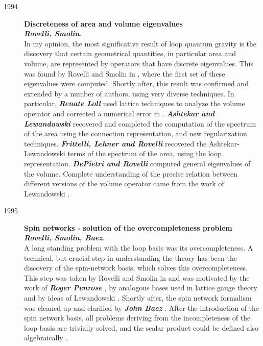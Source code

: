 \begin{description}
	\item[1994] {\bf Discreteness of area and volume eigenvalues\\
	{\em Rovelli, Smolin}}.\\
	In my opinion, the most significative result of loop quantum 
	gravity is the discovery that certain geometrical quantities, 
	in particular area and volume, are represented by operators 
	that have discrete eigenvalues.  This was found by Rovelli 
	and Smolin in \cite{RovelliSmolin95}, where the first set of 
	these eigenvalues were computed.   Shortly after, this result 
	was confirmed and extended by a number of authors, using very 
	diverse techniques.  In particular, \textbf{\em Renate Loll} 
	\cite{Loll95b,Loll95bb} used lattice techniques to analyze 
	the volume operator and corrected a numerical error in 
	\cite{RovelliSmolin95}.  \textbf{\em Ashtekar and 
	Lewandowski} \cite{LewandowskiArea,AshtekarLewandowskiArea2} 
	recovered and completed the computation of the spectrum of 
	the area using the connection representation, and new 
	regularization techniques.  \textbf{\em 
	Frittelli, Lehner and Rovelli} \cite{FrittelliEtAl} recovered 
	the Ashtekar-Lewandowski terms of the spectrum of the area, 
	using the loop representation.  \textbf{\em DePietri and 
	Rovelli\/} \cite{DePietriRovelli} computed general 
	eigenvalues of the volume.  Complete understanding of the 
	precise relation between different versions of the volume 
	operator came from the work of Lewandowski 
	\cite{Lewandowski97}.

	\item[1995] {\bf  Spin networks - solution of the overcompleteness 
	problem\\
	{\em Rovelli, Smolin, Baez}}.\\
	A long standing problem with the loop basis was its 
	overcompleteness.  A technical, but crucial step in understanding 
	the theory has been the discovery of the spin-network basis, which 
	solves this overcompleteness.  This step was taken by Rovelli and 
	Smolin in \cite{RovelliSmolin95b} and was motivated by the work of 
	\textbf{\em Roger Penrose} \cite{Penrose,Penrose2}, by analogous 
	bases used in lattice gauge theory and by ideas of Lewandowski 
	\cite{JerzyGraph}.  Shortly after, the spin network formalism was 
	cleaned up and clarified by \textbf{\em John Baez} 
	\cite{Baez95a,Baez95aa}.  After the introduction of the spin 
	network basis, all problems deriving from the incompleteness of 
	the loop basis are trivially solved, and the scalar product could 
	be defined also algebraically \cite{DePietriRovelli}.
	

\end{description}
